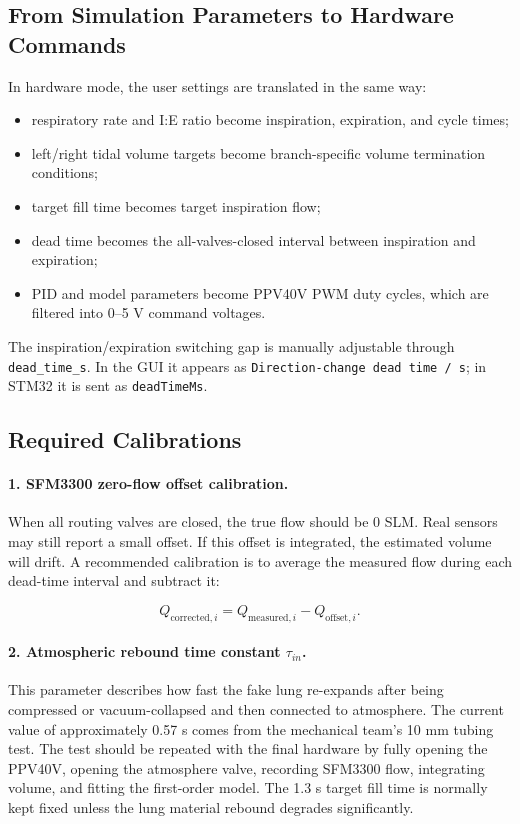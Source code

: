 \documentclass[11pt,a4paper]{article}
\begin{document}
\subsection{From Simulation Parameters to Hardware Commands}

In hardware mode, the user settings are translated in the same way:

\begin{itemize}
  \item respiratory rate and I:E ratio become inspiration, expiration, and cycle times;
  \item left/right tidal volume targets become branch-specific volume termination conditions;
  \item target fill time becomes target inspiration flow;
  \item dead time becomes the all-valves-closed interval between inspiration and expiration;
  \item PID and model parameters become PPV40V PWM duty cycles, which are filtered into 0--5 V command voltages.
\end{itemize}

The inspiration/expiration switching gap is manually adjustable through \texttt{dead\_time\_s}. In the GUI it appears as \texttt{Direction-change dead time / s}; in STM32 it is sent as \texttt{deadTimeMs}.

\subsection{Required Calibrations}

\paragraph{1. SFM3300 zero-flow offset calibration.}
When all routing valves are closed, the true flow should be 0 SLM. Real sensors may still report a small offset. If this offset is integrated, the estimated volume will drift. A recommended calibration is to average the measured flow during each dead-time interval and subtract it:

\begin{equation}
  Q_{\mathrm{corrected},i}=Q_{\mathrm{measured},i}-Q_{\mathrm{offset},i}.
\end{equation}

\paragraph{2. Atmospheric rebound time constant \texorpdfstring{$\tau_{in}$}{tau\_in}.}
This parameter describes how fast the fake lung re-expands after being compressed or vacuum-collapsed and then connected to atmosphere. The current value of approximately 0.57 s comes from the mechanical team's 10 mm tubing test. The test should be repeated with the final hardware by fully opening the PPV40V, opening the atmosphere valve, recording SFM3300 flow, integrating volume, and fitting the first-order model. The 1.3 s target fill time is normally kept fixed unless the lung material rebound degrades significantly.
\end{document}
